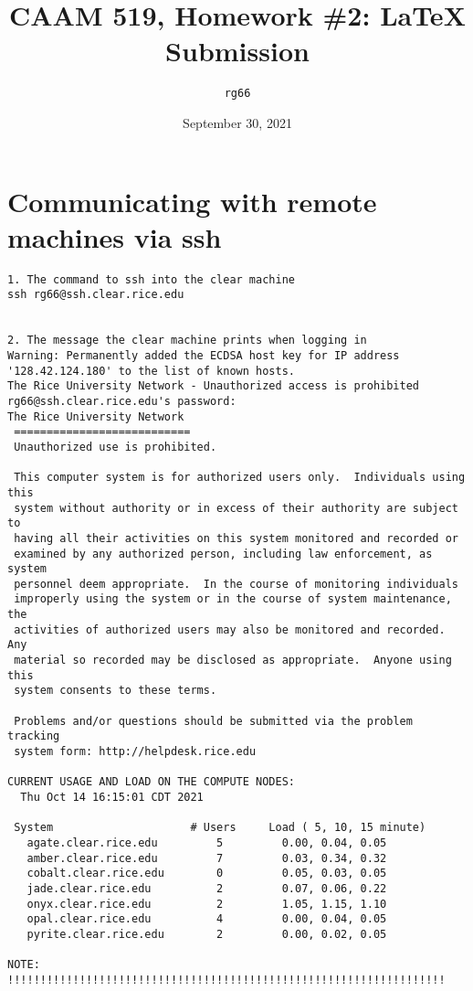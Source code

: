 \documentclass[12 pt]{article}
\title{CAAM 519, Homework \#2: \LaTeX{} Submission}
\author{\texttt{rg66}}
\date{September 30, 2021}
\begin{document}
\maketitle

\section{Communicating with remote machines via ssh}

\begin{verbatim}
1. The command to ssh into the clear machine
ssh rg66@ssh.clear.rice.edu


2. The message the clear machine prints when logging in
Warning: Permanently added the ECDSA host key for IP address '128.42.124.180' to the list of known hosts.
The Rice University Network - Unauthorized access is prohibited
rg66@ssh.clear.rice.edu's password: 
The Rice University Network
 ===========================
 Unauthorized use is prohibited.
 
 This computer system is for authorized users only.  Individuals using this
 system without authority or in excess of their authority are subject to
 having all their activities on this system monitored and recorded or
 examined by any authorized person, including law enforcement, as system
 personnel deem appropriate.  In the course of monitoring individuals
 improperly using the system or in the course of system maintenance, the
 activities of authorized users may also be monitored and recorded.  Any
 material so recorded may be disclosed as appropriate.  Anyone using this
 system consents to these terms.
 
 Problems and/or questions should be submitted via the problem tracking
 system form: http://helpdesk.rice.edu
 
CURRENT USAGE AND LOAD ON THE COMPUTE NODES:
  Thu Oct 14 16:15:01 CDT 2021

 System                   	# Users   	Load ( 5, 10, 15 minute)      
   agate.clear.rice.edu   	    5     	  0.00, 0.04, 0.05            
   amber.clear.rice.edu   	    7     	  0.03, 0.34, 0.32            
   cobalt.clear.rice.edu  	    0     	  0.05, 0.03, 0.05            
   jade.clear.rice.edu    	    2     	  0.07, 0.06, 0.22            
   onyx.clear.rice.edu    	    2     	  1.05, 1.15, 1.10            
   opal.clear.rice.edu    	    4     	  0.00, 0.04, 0.05            
   pyrite.clear.rice.edu  	    2     	  0.00, 0.02, 0.05            

NOTE: !!!!!!!!!!!!!!!!!!!!!!!!!!!!!!!!!!!!!!!!!!!!!!!!!!!!!!!!!!!!!!!!!!!
 

\end{verbatim}
\end{document}
